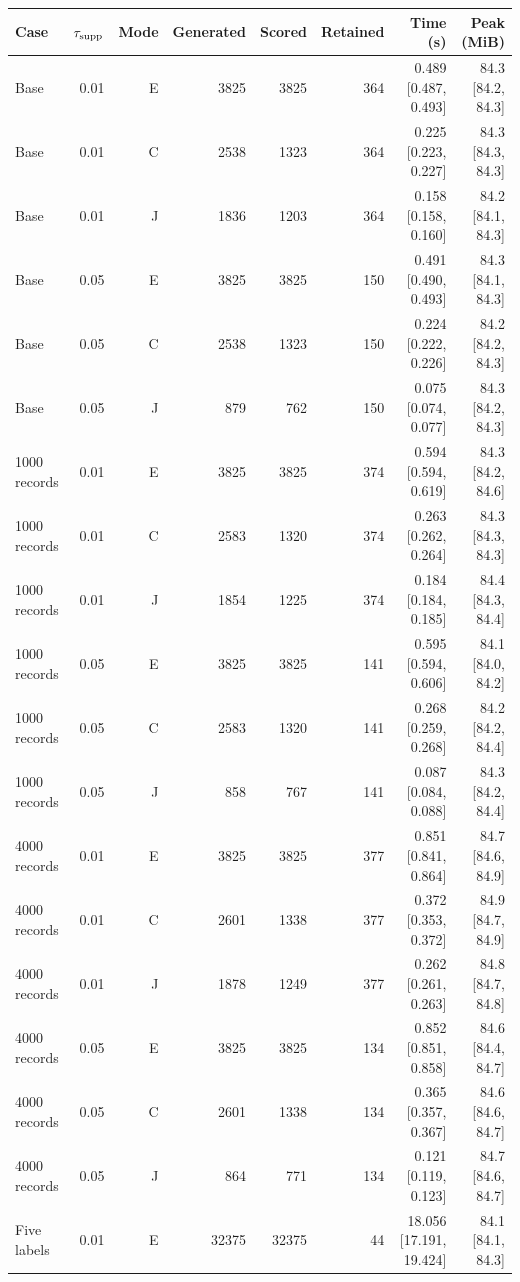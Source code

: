 \begin{table}
\label{tab:computational-axes}
\begin{tabular}{lrrrrrrr}
\toprule
Case & $\tau_{\rm supp}$ & Mode & Generated & Scored & Retained & Time (s) & Peak (MiB) \\
\midrule
Base & 0.01 & E & 3825 & 3825 & 364 & 0.489 [0.487, 0.493] & 84.3 [84.2, 84.3] \\
Base & 0.01 & C & 2538 & 1323 & 364 & 0.225 [0.223, 0.227] & 84.3 [84.3, 84.3] \\
Base & 0.01 & J & 1836 & 1203 & 364 & 0.158 [0.158, 0.160] & 84.2 [84.1, 84.3] \\
Base & 0.05 & E & 3825 & 3825 & 150 & 0.491 [0.490, 0.493] & 84.3 [84.1, 84.3] \\
Base & 0.05 & C & 2538 & 1323 & 150 & 0.224 [0.222, 0.226] & 84.2 [84.2, 84.3] \\
Base & 0.05 & J & 879 & 762 & 150 & 0.075 [0.074, 0.077] & 84.3 [84.2, 84.3] \\
1000 records & 0.01 & E & 3825 & 3825 & 374 & 0.594 [0.594, 0.619] & 84.3 [84.2, 84.6] \\
1000 records & 0.01 & C & 2583 & 1320 & 374 & 0.263 [0.262, 0.264] & 84.3 [84.3, 84.3] \\
1000 records & 0.01 & J & 1854 & 1225 & 374 & 0.184 [0.184, 0.185] & 84.4 [84.3, 84.4] \\
1000 records & 0.05 & E & 3825 & 3825 & 141 & 0.595 [0.594, 0.606] & 84.1 [84.0, 84.2] \\
1000 records & 0.05 & C & 2583 & 1320 & 141 & 0.268 [0.259, 0.268] & 84.2 [84.2, 84.4] \\
1000 records & 0.05 & J & 858 & 767 & 141 & 0.087 [0.084, 0.088] & 84.3 [84.2, 84.4] \\
4000 records & 0.01 & E & 3825 & 3825 & 377 & 0.851 [0.841, 0.864] & 84.7 [84.6, 84.9] \\
4000 records & 0.01 & C & 2601 & 1338 & 377 & 0.372 [0.353, 0.372] & 84.9 [84.7, 84.9] \\
4000 records & 0.01 & J & 1878 & 1249 & 377 & 0.262 [0.261, 0.263] & 84.8 [84.7, 84.8] \\
4000 records & 0.05 & E & 3825 & 3825 & 134 & 0.852 [0.851, 0.858] & 84.6 [84.4, 84.7] \\
4000 records & 0.05 & C & 2601 & 1338 & 134 & 0.365 [0.357, 0.367] & 84.6 [84.6, 84.7] \\
4000 records & 0.05 & J & 864 & 771 & 134 & 0.121 [0.119, 0.123] & 84.7 [84.6, 84.7] \\
Five labels & 0.01 & E & 32375 & 32375 & 44 & 18.056 [17.191, 19.424] & 84.1 [84.1, 84.3] \\

\end{tabular}
\end{table}
